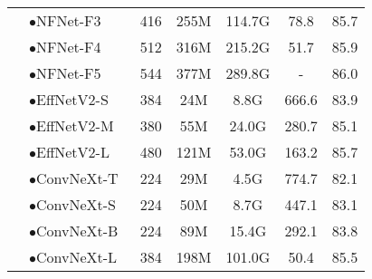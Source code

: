\documentclass[runningheads]{llncs}
\begin{document}
\begin{table}[!t]
\begin{tabular}{c|l|ccccc}
& \textcolor{blueish}{$\bullet$}NFNet-F3~\cite{brock2021high} & 416 & 255M & 114.7G & 78.8 & 85.7 \\
& \textcolor{blueish}{$\bullet$}NFNet-F4~\cite{brock2021high} & 512 & 316M & 215.2G & 51.7 &  85.9 \\
& \textcolor{blueish}{$\bullet$}NFNet-F5~\cite{brock2021high} & 544 & 377M & 289.8G & - & 86.0 \\
& \textcolor{blueish}{$\bullet$}EffNetV2-S~\cite{tan2021efficientnetv2} & 384 & 24M & 8.8G & 666.6 & 83.9 \\
& \textcolor{blueish}{$\bullet$}EffNetV2-M~\cite{tan2021efficientnetv2} & 380 & 55M & 24.0G & 280.7 & 85.1 \\
& \textcolor{blueish}{$\bullet$}EffNetV2-L~\cite{tan2021efficientnetv2} & 480 & 121M & 53.0G & 163.2 & 85.7 \\
& \textcolor{blueish}{$\bullet$}ConvNeXt-T~\cite{liu2022convnet} & 224 & 29M & 4.5G & 774.7 & 82.1 \\
& \textcolor{blueish}{$\bullet$}ConvNeXt-S~\cite{liu2022convnet} & 224 & 50M & 8.7G & 447.1 & 83.1 \\
& \textcolor{blueish}{$\bullet$}ConvNeXt-B~\cite{liu2022convnet} & 224 & 89M & 15.4G & 292.1 & 83.8 \\
& \textcolor{blueish}{$\bullet$}ConvNeXt-L~\cite{liu2022convnet} & 384 & 198M & 101.0G & 50.4 & 85.5 \\
\midrule


\end{tabular}
\end{table}
\end{document}
